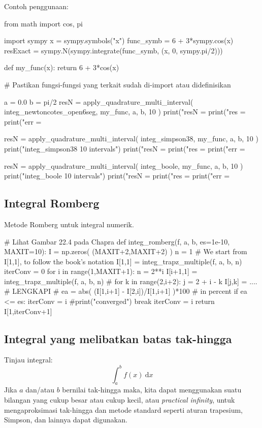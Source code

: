 Contoh penggunaan:
\begin{pythoncode}
from math import cos, pi

import sympy
x = sympy.symbols("x")
func_symb = 6 + 3*sympy.cos(x)
resExact = sympy.N(sympy.integrate(func_symb, (x, 0, sympy.pi/2)))

def my_func(x):
    return 6 + 3*cos(x)

# Pastikan fungsi-fungsi yang terkait sudah di-import atau didefinisikan

a = 0.0
b = pi/2
resN = apply_quadrature_multi_interval(
    integ_newtoncotes_open6seg, my_func, a, b, 10
)
print("resN = %
print("res  = %
print("err  = %

resN = apply_quadrature_multi_interval(
    integ_simpson38, my_func, a, b, 10
)
print("\nUsing integ_simpson38 10 intervals")
print("resN = %
print("res  = %
print("err  = %

resN = apply_quadrature_multi_interval(
    integ_boole, my_func, a, b, 10
)
print("\nUsing integ_boole 10 intervals")
print("resN = %
print("res  = %
print("err  = %
\end{pythoncode}

\subsection*{Integral Romberg}
Metode Romberg untuk integral numerik.
\begin{pythoncode}
# Lihat Gambar 22.4 pada Chapra
def integ_romberg(f, a, b, es=1e-10, MAXIT=10):
    I = np.zeros( (MAXIT+2,MAXIT+2) )
    n = 1
    # We start from I[1,1], to follow the book's notation
    I[1,1] = integ_trapz_multiple(f, a, b, n)
    iterConv = 0
    for i in range(1,MAXIT+1):
        n = 2**i
        I[i+1,1] = integ_trapz_multiple(f, a, b, n)
        #
        for k in range(2,i+2):
            j = 2 + i - k
            I[j,k] = .... # LENGKAPI
        #
        ea = abs( (I[1,i+1] - I[2,i])/I[1,i+1] )*100 # in percent
        if ea <= es:
            iterConv = i
            #print("converged")
            break
        iterConv = i
    return I[1,iterConv+1]
\end{pythoncode}


\subsection*{Integral yang melibatkan batas tak-hingga}
Tinjau integral:
\begin{equation}
\int_{a}^{b} f(x)\ \mathrm{d}x
\label{eq:orig_integ}
\end{equation}
Jika $a$ dan/atau $b$ bernilai tak-hingga maka, kita dapat menggunakan suatu bilangan
yang cukup besar atau cukup kecil, atau \textit{practical infinity},
untuk mengaproksimasi tak-hingga dan metode
standard seperti aturan trapesium, Simpson, dan lainnya dapat digunakan.

